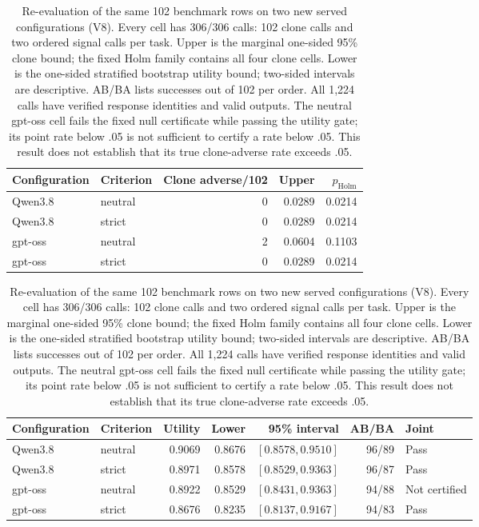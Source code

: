 \begin{table}[t]
\centering\small
\setlength{\tabcolsep}{4pt}
\begin{tabular}{llrrr}
\toprule
Configuration & Criterion & Clone adverse/102 & Upper & $p_{\mathrm{Holm}}$ \\
\midrule
Qwen3.8 & neutral & 0 & 0.0289 & 0.0214 \\
Qwen3.8 & strict & 0 & 0.0289 & 0.0214 \\
gpt-oss & neutral & 2 & 0.0604 & 0.1103 \\
gpt-oss & strict & 0 & 0.0289 & 0.0214 \\
\bottomrule
\end{tabular}
\medskip
\begin{tabular}{llrrrrl}
\toprule
Configuration & Criterion & Utility & Lower & 95\% interval & AB/BA & Joint \\
\midrule
Qwen3.8 & neutral & 0.9069 & 0.8676 & $[0.8578,0.9510]$ & 96/89 & Pass \\
Qwen3.8 & strict & 0.8971 & 0.8578 & $[0.8529,0.9363]$ & 96/87 & Pass \\
gpt-oss & neutral & 0.8922 & 0.8529 & $[0.8431,0.9363]$ & 94/88 & Not certified \\
gpt-oss & strict & 0.8676 & 0.8235 & $[0.8137,0.9167]$ & 94/83 & Pass \\
\bottomrule
\end{tabular}
\caption{Re-evaluation of the same 102 benchmark rows on two new served configurations (V8). Every cell has 306/306 calls: 102 clone calls and two ordered signal calls per task. Upper is the marginal one-sided 95\% clone bound; the fixed Holm family contains all four clone cells. Lower is the one-sided stratified bootstrap utility bound; two-sided intervals are descriptive. AB/BA lists successes out of 102 per order. All 1,224 calls have verified response identities and valid outputs. The neutral gpt-oss cell fails the fixed null certificate while passing the utility gate; its point rate below .05 is not sufficient to certify a rate below .05. This result does not establish that its true clone-adverse rate exceeds .05.}
\label{tab:v8-results}
\end{table}
